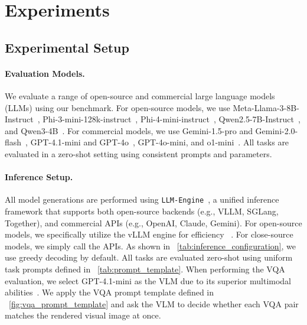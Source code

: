 
\section{Experiments}


\subsection{Experimental Setup}

\paragraph{Evaluation Models.}
We evaluate a range of open-source and commercial large language models (LLMs) using our benchmark. For open-source models, we use Meta-Llama-3-8B-Instruct~\cite{grattafiori2024llama3herdmodels}, Phi-3-mini-128k-instruct~\cite{abdin2024phi3technicalreporthighly}, Phi-4-mini-instruct~\cite{abdin2024phi4technicalreport}, Qwen2.5-7B-Instruct~\cite{yang2024qwen2technicalreport}, and Qwen3-4B~\cite{yang2025qwen3technicalreport}. For commercial models, we use Gemini-1.5-pro and Gemini-2.0-flash~\cite{team2023gemini}, GPT-4.1-mini and GPT-4o~\cite{Hurst2024GPT4oSC}, GPT-4o-mini, and o1-mini~\cite{Contributors2024OpenAIOS}. All tasks are evaluated in a zero-shot setting using consistent prompts and parameters.


\paragraph{Inference Setup.} All model generations are performed using \texttt{LLM-Engine}~\cite{jiang2024llmengines}, a unified inference framework that supports both open-source backends (e.g., VLLM, SGLang, Together), and commercial APIs (e.g., OpenAI, Claude, Gemini). For open-source models, we specifically utilize the vLLM engine for efficiency ~\cite{kwon2023efficient}. For close-source models, we simply call the APIs. As shown in ~\autoref{tab:inference_configuration}, we use greedy decoding by default. All tasks are evaluated zero-shot using uniform task prompts defined in ~\autoref{tab:prompt_template}. When performing the VQA evaluation, we select GPT-4.1-mini as the VLM due to its superior multimodal abilities~\citep{openai2025gpt41}. We apply the VQA prompt template defined in ~\autoref{fig:vqa_prompt_template} and ask the VLM to decide whether each VQA pair matches the rendered visual image at once.



